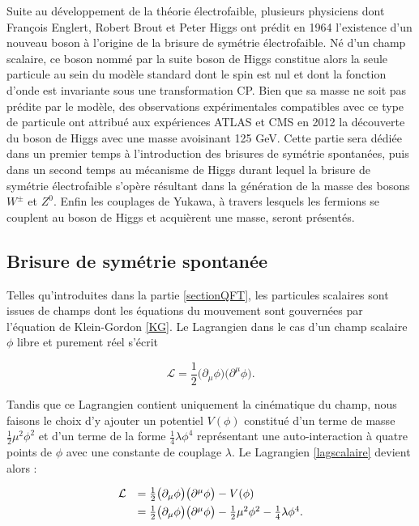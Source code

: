         Suite au développement de la théorie électrofaible, plusieurs physiciens dont François Englert, Robert Brout et Peter Higgs ont prédit en 1964 l'existence d'un nouveau boson à l'origine de la brisure de symétrie électrofaible. Né d'un champ scalaire, ce boson nommé par la suite boson de Higgs constitue alors la seule particule au sein du modèle standard dont le spin est nul et dont la fonction d'onde est invariante sous une transformation CP. Bien que sa masse ne soit pas prédite par le modèle, des observations expérimentales compatibles avec ce type de particule ont attribué aux expériences ATLAS et CMS en 2012 la découverte du boson de Higgs avec une masse avoisinant 125 GeV. Cette partie sera dédiée dans un premier temps à l'introduction des brisures de symétrie spontanées, puis dans un second temps au mécanisme de Higgs durant lequel la brisure de symétrie électrofaible s'opère résultant dans la génération de la masse des bosons $W^{\pm}$ et $Z^0$. Enfin les couplages de Yukawa, à travers lesquels les fermions se couplent au boson de Higgs et acquièrent une masse, seront présentés.

        \subsection{Brisure de symétrie spontanée}

        Telles qu'introduites dans la partie \ref{sectionQFT}, les particules scalaires sont issues de champs dont les équations du mouvement sont gouvernées par l'équation de Klein-Gordon \ref{KG}. Le Lagrangien dans le cas d'un champ scalaire $\phi$ libre et purement réel s'écrit

        \begin{equation}
            \mathcal{L}=\frac{1}{2}\bigl(\partial_{\mu}\phi\bigr)\bigl(\partial^{\mu}\phi\bigr).
        \label{lagscalaire}
        \end{equation}

        Tandis que ce Lagrangien contient uniquement la cinématique du champ, nous faisons le choix d'y ajouter un potentiel $V(\phi)$ constitué d'un terme de masse $\frac{1}{2}\mu^2\phi^2$ et d'un terme de la forme $\frac{1}{4}\lambda\phi^4$ représentant une auto-interaction à quatre points de $\phi$ avec une constante de couplage $\lambda$. Le Lagrangien \ref{lagscalaire} devient alors :

        \begin{equation}
        \begin{array}{ll}
            \mathcal{L}&=\frac{1}{2}\bigl(\partial_{\mu}\phi\bigr)\bigl(\partial^{\mu}\phi\bigr)-V(\phi) \vspace{4pt}\\
                       &=\frac{1}{2}\bigl(\partial_{\mu}\phi\bigr)\bigl(\partial^{\mu}\phi\bigr)-\frac{1}{2}\mu^2\phi^2-\frac{1}{4}\lambda\phi^4.
        \end{array}
        \label{laghiggs}
        \end{equation}

